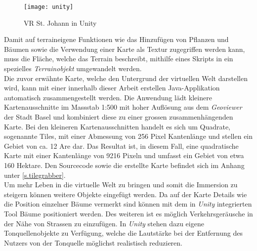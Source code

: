 \begin{figure}[hbt]
	\vspace{-25pt}
	\begin{center}
		\texttt{[image: unity]}
	\end{center}
	\vspace{-15pt}
	\caption{VR St. Johann in Unity}\label{unity}
	\vspace{-15pt}
\end{figure}

Damit auf terraineigene Funktionen wie das Hinzufügen von Pflanzen und Bäumen sowie die Verwendung einer Karte als Textur zugegriffen werden kann, muss die Fläche, welche das Terrain beschreibt, mithilfe eines Skripts\cite{website:terrain} in ein spezielles \textit{Terrainobjekt} umgewandelt werden.\\[6pt]
Die zuvor erwähnte Karte, welche den Untergrund der virtuellen Welt darstellen wird, kann mit einer innerhalb dieser Arbeit erstellen Java-Applikation automatisch zusammengestellt werden. Die Anwendung lädt kleinere Kartenausschnitte im Massstab 1:500 mit hoher Auflösung aus dem \textit{Geoviewer} der Stadt Basel und kombiniert diese zu einer grossen zusammenhängenden Karte. Bei den kleineren Kartenausschnitten handelt es sich um Quadrate, sogenannte Tiles, mit einer Abmessung von 256 Pixel Kantenlänge und stellen ein Gebiet von ca. 12 Are dar. Das Resultat ist, in diesem Fall, eine quadratische Karte mit einer Kantenlänge von 9216 Pixeln und umfasst ein Gebiet von etwa 160 Hektare. Den Sourcecode sowie die erstellte Karte befindet sich im Anhang unter \ref{s.tilegrabber}.\\[6pt]
Um mehr Leben in die virtuelle Welt zu bringen und somit die Immersion zu steigern können weitere Objekte eingefügt werden. Da auf der Karte Details wie die Position einzelner Bäume vermerkt sind können mit dem in \textit{Unity} integrierten Tool Bäume positioniert werden. Des weiteren ist es möglich Verkehrsgeräusche in der Nähe von Strassen zu einzufügen. In \textit{Unity} stehen dazu eigene Tonquellenobjekte zu Verfügung, welche die Lautstärke bei der Entfernung des Nutzers von der Tonquelle möglichst realistisch reduzieren.

